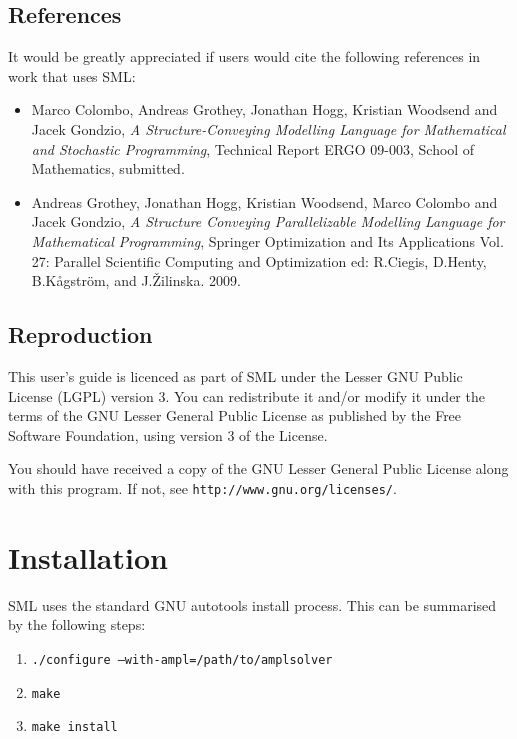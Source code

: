 \documentclass[10pt,a4paper]{report}
\begin{document}
\section*{References}

It would be greatly appreciated if users would cite the following references
in work that uses SML:
\begin{itemize}
  \item {\sc Marco Colombo, Andreas Grothey, Jonathan Hogg, Kristian Woodsend and Jacek Gondzio}, {\it A Structure-Conveying Modelling Language for Mathematical and Stochastic Programming}, {Technical Report ERGO 09-003, School of Mathematics, submitted.}
   \item {\sc Andreas Grothey, Jonathan Hogg, Kristian Woodsend, Marco Colombo and Jacek Gondzio}, {\it A Structure Conveying Parallelizable Modelling Language for Mathematical Programming}, {Springer Optimization and Its Applications Vol. 27: Parallel Scientific Computing and Optimization ed: R.Ciegis, D.Henty, B.K\r{a}gstr\"{o}m, and J.\v{Z}ilinska. 2009.}
\end{itemize}

\section*{Reproduction}

This user's guide is licenced as part of SML under the Lesser GNU Public
License (LGPL) version 3. You can redistribute it and/or modify it under the
terms of the GNU Lesser General Public License as published by the Free
Software Foundation, using version 3 of the License.

You should have received a copy of the GNU Lesser General Public License
along with this program. If not, see {\tt http://www.gnu.org/licenses/}.

\chapter{Installation}

SML uses the standard GNU autotools install process. This can be summarised
by the following steps:
\begin{enumerate}
   \item {\tt ./configure --with-ampl=/path/to/amplsolver}
   \item {\tt make}
   \item {\tt make install}
\end{enumerate}
\end{document}
